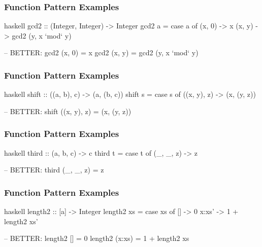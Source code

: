 \documentclass[dvipsnames]{beamer}
\theoremstyle{plain}
\begin{document}
\begin{frame}[fragile]
  \frametitle{Function Pattern Examples}

  \begin{exampleblock}{}
    \begin{pygments}{haskell}
gcd2 :: (Integer, Integer) -> Integer
gcd2 a =
    case a of
      (x, 0) -> x
      (x, y) -> gcd2 (y, x `mod` y)

-- BETTER:
gcd2 (x, 0) = x
gcd2 (x, y) = gcd2 (y, x `mod` y)
    \end{pygments}
  \end{exampleblock}
\end{frame}

\begin{frame}[fragile]
  \frametitle{Function Pattern Examples}

  \begin{exampleblock}{}
    \begin{pygments}{haskell}
shift :: ((a, b), c) -> (a, (b, c))
shift s =
    case s of
      ((x, y), z) -> (x, (y, z))

-- BETTER:
shift ((x, y), z) = (x, (y, z))
    \end{pygments}
  \end{exampleblock}
\end{frame}

\begin{frame}[fragile]
  \frametitle{Function Pattern Examples}

  \begin{exampleblock}{}
    \begin{pygments}{haskell}
third :: (a, b, c) -> c
third t =
    case t of
      (_, _, z) -> z

-- BETTER:
third (_, _, z) = z
    \end{pygments}
  \end{exampleblock}
\end{frame}

\begin{frame}[fragile]
  \frametitle{Function Pattern Examples}

  \begin{exampleblock}{}
    \begin{pygments}{haskell}
length2 :: [a] -> Integer
length2 xs =
    case xs of
      []    -> 0
      x:xs' -> 1 + length2 xs'

-- BETTER:
length2 [] = 0
length2 (x:xs) = 1 + length2 xs
    \end{pygments}
  \end{exampleblock}
\end{frame}
\end{document}

